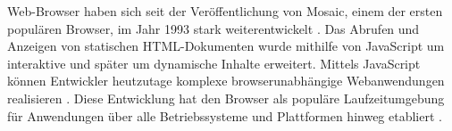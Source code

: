 Web-Browser haben sich seit der Veröffentlichung von Mosaic, einem der ersten populären Browser, im Jahr 1993 stark weiterentwickelt \cite{EvolutionOfTheWebBrowser}. Das Abrufen und Anzeigen von statischen HTML-Dokumenten wurde mithilfe von JavaScript um interaktive und später um dynamische Inhalte erweitert. Mittels JavaScript können Entwickler heutzutage komplexe browserunabhängige Webanwendungen realisieren \cite{SinglePageApplication}. Diese Entwicklung hat den Browser als populäre Laufzeitumgebung für Anwendungen über alle Betriebssysteme und Plattformen hinweg etabliert \cite{TheWebAsAnApplicationPlatform}.



\vspace{\baselineskip}

